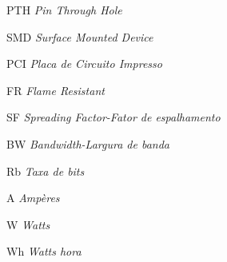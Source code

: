 \begin{siglas}
  \item [PTH] \textit{Pin Through Hole}
  \item [SMD] \textit{Surface Mounted Device}
  \item [PCI] \textit{Placa de Circuito Impresso}
  \item [FR] \textit{Flame Resistant}
  \item [SF] \textit{Spreading Factor-Fator de espalhamento}
  \item [BW] \textit{Bandwidth-Largura de banda}
  \item [Rb] \textit{Taxa de bits}
  \item [A] \textit{Ampères}
  \item [W] \textit{Watts}
  \item [Wh] \textit{Watts hora}
  
  
\end{siglas}
